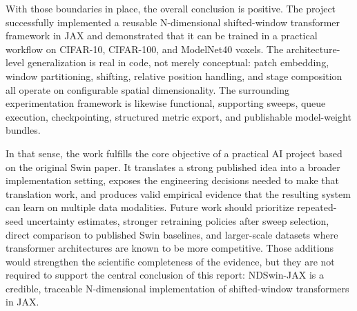 With those boundaries in place, the overall conclusion is positive. The project successfully implemented a reusable N-dimensional shifted-window transformer framework in JAX and demonstrated that it can be trained in a practical workflow on CIFAR-10, CIFAR-100, and ModelNet40 voxels. The architecture-level generalization is real in code, not merely conceptual: patch embedding, window partitioning, shifting, relative position handling, and stage composition all operate on configurable spatial dimensionality. The surrounding experimentation framework is likewise functional, supporting sweeps, queue execution, checkpointing, structured metric export, and publishable model-weight bundles.

In that sense, the work fulfills the core objective of a practical AI project based on the original Swin paper. It translates a strong published idea into a broader implementation setting, exposes the engineering decisions needed to make that translation work, and produces valid empirical evidence that the resulting system can learn on multiple data modalities. Future work should prioritize repeated-seed uncertainty estimates, stronger retraining policies after sweep selection, direct comparison to published Swin baselines, and larger-scale datasets where transformer architectures are known to be more competitive. Those additions would strengthen the scientific completeness of the evidence, but they are not required to support the central conclusion of this report: NDSwin-JAX is a credible, traceable N-dimensional implementation of shifted-window transformers in JAX.
